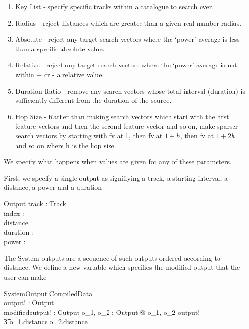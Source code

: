 \documentclass[11pt]{article}
\begin{document}
\begin{enumerate}

\item \textsf{Key List} -  specify specific tracks within a catalogue to search over. 

\item \textsf{Radius} - reject distances which are greater than a given real number radius. 

\item \textsf{Absolute} - reject any target search vectors where the `power' average is less than a specific absolute value.

\item \textsf{Relative} - reject any target search vectors where the `power' average is not within  + or  - a relative value. 

\item \textsf{Duration Ratio} - remove any search vectors whose total interval (duration) is sufficiently different from the duration of the source. 

\item \textsf{Hop Size} - Rather than making search vectors which start with the first feature vectors and then the second feature vector and so on, make sparser search vectors by starting with fv at 1, then fv at $1 + h$, then fv at $1 + 2h$ and so on where h is the hop size. 

\end{enumerate}

We specify what happens when values are given for any of these parameters. 

First, we specify a single output as signifiying a track, a starting interval, a distance, a power and a duration

\begin{schema}{Output} 
	track : Track \\
	index : \nat \\
	distance : \R \\
	duration : \R \\
	power : \R \\
\end{schema}

The System outputs are a sequence of such outputs ordered according to distance. We define a new variable which specifies the modified output that the user can make. 

\begin{schema}{SystemOutput}
	CompiledData  \\
	output! : \seq Output \\
	modifiedoutput! : \seq Output
\where
	\forall o_1, o_2 : Output @ \langle o_1, o_2 \rangle \inseq output! \\
	\t3 \implies o_1.distance \leq o_2.distance 
\end{schema}
\end{document}
